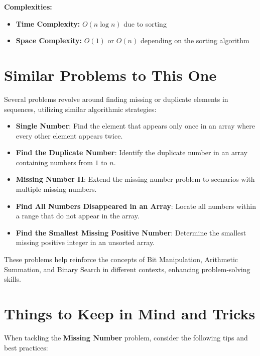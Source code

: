 \textbf{Complexities:}
\begin{itemize}
    \item \textbf{Time Complexity:} \(O(n \log n)\) due to sorting
    \item \textbf{Space Complexity:} \(O(1)\) or \(O(n)\) depending on the sorting algorithm
\end{itemize}

\section*{Similar Problems to This One}

Several problems revolve around finding missing or duplicate elements in sequences, utilizing similar algorithmic strategies:

\begin{itemize}
    \item \textbf{Single Number}: Find the element that appears only once in an array where every other element appears twice.
    \item \textbf{Find the Duplicate Number}: Identify the duplicate number in an array containing numbers from \(1\) to \(n\).
    \item \textbf{Missing Number II}: Extend the missing number problem to scenarios with multiple missing numbers.
    \item \textbf{Find All Numbers Disappeared in an Array}: Locate all numbers within a range that do not appear in the array.
    \item \textbf{Find the Smallest Missing Positive Number}: Determine the smallest missing positive integer in an unsorted array.
\end{itemize}

These problems help reinforce the concepts of Bit Manipulation, Arithmetic Summation, and Binary Search in different contexts, enhancing problem-solving skills.

\section*{Things to Keep in Mind and Tricks}

When tackling the \textbf{Missing Number} problem, consider the following tips and best practices:

